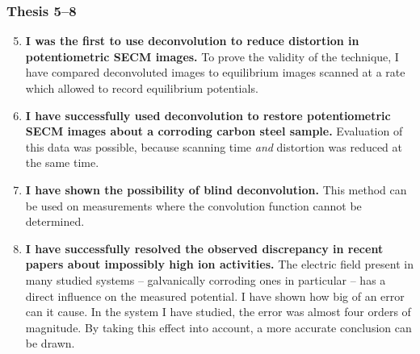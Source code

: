 \documentclass{beamer}
\begin{document}
\begin{frame}
\frametitle{Thesis 5--8}
\scriptsize
\begin{enumerate}
\setcounter{enumi}{4}
\item \textbf{I was the first to use deconvolution to reduce distortion in potentiometric SECM images.}
To prove the validity of the technique, I have compared deconvoluted images to equilibrium images scanned at a rate which allowed to record equilibrium potentials.

\item \textbf{I have successfully used deconvolution to restore potentiometric SECM images about a corroding carbon steel sample.}
Evaluation of this data was possible, because scanning time \emph{and} distortion was reduced at the same time.

\item \textbf{I have shown the possibility of blind deconvolution.}
This method can be used on measurements where the convolution function cannot be determined.

\item \textbf{I have successfully resolved the observed discrepancy in recent papers about impossibly high ion activities.}
The electric field present in many studied systems -- galvanically corroding ones in particular -- has a direct influence on the measured potential.
I have shown how big of an error can it cause.
In the system I have studied, the error was almost four orders of magnitude.
By taking this effect into account, a more accurate conclusion can be drawn.
\end{enumerate}
\end{frame}
\end{document}
